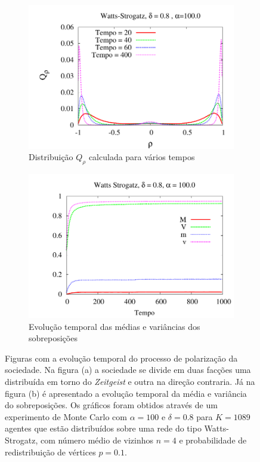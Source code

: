 \begin{figure} 
  \centering
  \begin{subfigure}[]{0.5\textwidth}
  \includegraphics[width = \textwidth]{Figures/Histograma_Watts_Strogatz_Polariza}
  \caption{Distribuição $Q_\rho$ calculada para vários tempos}
  \end{subfigure}
  \begin{subfigure}[]{0.45\textwidth}
  \includegraphics[width = \textwidth]{Figures/MagTempo_Polariza}
  \newline
  \caption{Evolução temporal das médias e variâncias dos sobreposições}
  \end{subfigure}
  \newline
  \caption{
      Figuras com a evolução temporal do processo de polarização da
  sociedade. Na figura (a) a sociedade se divide em duas facções
  uma distribuída em torno do \textit{Zeitgeist} e outra na direção
  contraria. Já na figura (b) é apresentado a evolução
  temporal da média e variância do sobreposições. Os gráficos foram
  obtidos através de um experimento de Monte Carlo com $\alpha = 100$
  e $\delta = 0.8$ para $K = 1089$ agentes que estão distribuídos sobre
  uma rede do tipo Watts-Strogatz, com número médio de vizinhos $n=4$
  e probabilidade de redistribuição de vértices $p=0.1$.
  }
  \label{fig:Pol}
\end{figure}


